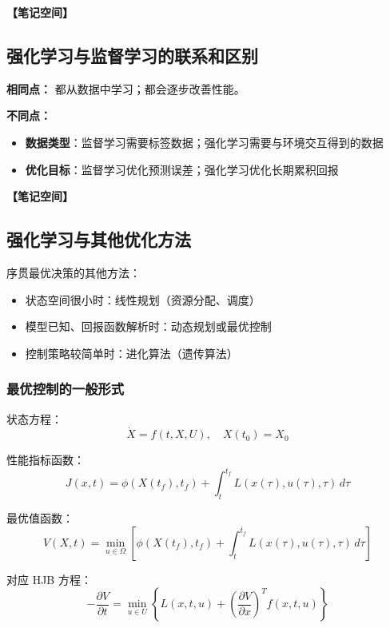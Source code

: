 \documentclass[12pt,a4paper]{article}
\newcommand{\notespace}[1][3cm]{%
  \vspace{#1}%
  \noindent\textbf{【笔记空间】}%
  \vspace{#1}%
}
\newcommand{\1}{\mathbf{1}}
\begin{document}
\notespace[2cm]

\subsection{强化学习与监督学习的联系和区别}

\textbf{相同点：} 都从数据中学习；都会逐步改善性能。

\textbf{不同点：}

\begin{itemize}[leftmargin=2em]
  \item \textbf{数据类型}：监督学习需要标签数据；强化学习需要与环境交互得到的数据
  \item \textbf{优化目标}：监督学习优化预测误差；强化学习优化长期累积回报
\end{itemize}

\notespace[2cm]

\subsection{强化学习与其他优化方法}

序贯最优决策的其他方法：

\begin{itemize}[leftmargin=2em]
  \item 状态空间很小时：线性规划（资源分配、调度）
  \item 模型已知、回报函数解析时：动态规划或最优控制
  \item 控制策略较简单时：进化算法（遗传算法）
\end{itemize}

\subsubsection*{最优控制的一般形式}

状态方程：
\begin{equation}
\dot{X} = f(t, X, U), \quad X(t_0)=X_0
\end{equation}

性能指标函数：
\begin{equation}
J(x,t)=\phi(X(t_f),t_f)+\int_t^{t_f} L(x(\tau),u(\tau),\tau)\,d\tau
\end{equation}

最优值函数：
\begin{equation}
V(X,t)=\min_{u\in\Omega}\left[\phi(X(t_f),t_f)+\int_t^{t_f} L(x(\tau),u(\tau),\tau)\,d\tau\right]
\end{equation}

对应 HJB 方程：
\begin{equation}
-\frac{\partial V}{\partial t} = \min_{u\in U} \left\{ L(x,t,u) + \left(\frac{\partial V}{\partial x}\right)^{\!T} f(x,t,u) \right\}
\end{equation}
\end{document}
